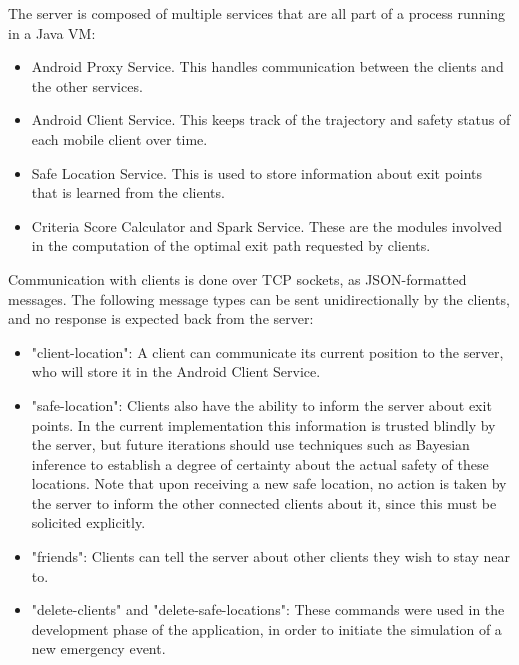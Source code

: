 
The server is composed of multiple services that are all part of a process
running in a Java VM:

\begin{itemize}
  \item Android Proxy Service. This handles communication between the clients
        and the other services.
  \item Android Client Service. This keeps track of the trajectory and safety
        status of each mobile client over time.
  \item Safe Location Service. This is used to store information about exit
        points that is learned from the clients.
  \item Criteria Score Calculator and Spark Service. These are the modules
        involved in the computation of the optimal exit path requested by
        clients.
\end{itemize}

Communication with clients is done over TCP sockets, as JSON-formatted messages.
The following message types can be sent unidirectionally by the clients, and
no response is expected back from the server:

\begin{itemize}
  \item "client-location": A client can communicate its current position to
        the server, who will store it in the Android Client Service.
  \item "safe-location": Clients also have the ability to inform the server
        about exit points. In the current implementation this information is
        trusted blindly by the server, but future iterations should use
        techniques such as Bayesian inference to establish a degree of
        certainty about the actual safety of these locations. Note that
        upon receiving a new safe location, no action is taken by the server
        to inform the other connected clients about it, since this must be
        solicited explicitly.
  \item "friends": Clients can tell the server about other clients they wish
         to stay near to.
  \item "delete-clients" and "delete-safe-locations": These commands were used
        in the development phase of the application, in order to initiate the
        simulation of a new emergency event.
\end{itemize}

